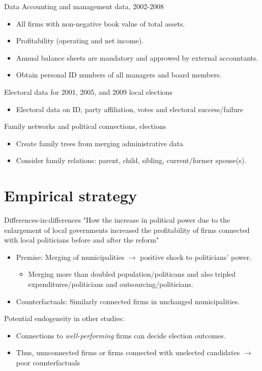 \documentclass[8pt]{beamer}
\begin{document}
\begin{frame}{Data}
  Accounting and management data, 2002-2008
  \begin{itemize}
    \item All firms with non-negative book value of total assets.
    \item Profitability (operating and net income).
    \item Annual balance sheets are mandatory and approwed by external accountants.
    \item Obtain personal ID numbers of all managers and board members.
  \end{itemize}
  Electoral data for 2001, 2005, and 2009 local elections
  \begin{itemize}
    \item Electoral data on ID, party affiliation, votes and electoral success/failure
  \end{itemize}
  Family networks and political connections, elections
  \begin{itemize}
    \item Create family trees from merging administrative data
    \item Consider family relations: parent, child, sibling, current/former spouse(s).
  \end{itemize}
\end{frame}


\section{Empirical strategy}


\begin{frame}{Differences-in-differences}
  "How the increase in political power due to the enlargement of local governments increased the profitability of firms connected with local politicians before and after the reform" \citep{amore2013value}
  \begin{itemize}
    \item Premise: Merging of municipalities $\rightarrow$ positive shock to politicians' power.
    \begin{itemize}
      \item Merging more than doubled population/politicans and also tripled expenditures/politicians and outsourcing/politicians.
    \end{itemize}
    \item Counterfactuals: Similarly connected firms in unchanged municipalities.
  \end{itemize}
  Potential endogeneity in other studies:
  \begin{itemize}
    \item Connections to \textit{well-performing} firms can decide election outcomes.
    \item Thus, unnconnected firms or firms connected with unelected candidates $\rightarrow$ poor counterfactuals
  \end{itemize}
\end{frame}
\end{document}
